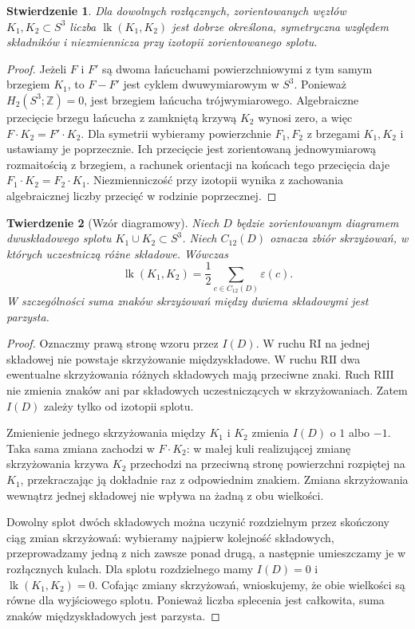 \documentclass[11pt,a4paper]{report}
\numberwithin{equation}{section}
\theoremstyle{plain}
\newtheorem{twierdzenie}{Twierdzenie}[section]
\newtheorem{stwierdzenie}[twierdzenie]{Stwierdzenie}
\theoremstyle{definition}
\theoremstyle{remark}
\begin{document}
\begin{stwierdzenie}
Dla dowolnych rozłącznych, zorientowanych węzłów
$K_1,K_2\subset S^3$ liczba $\operatorname{lk}(K_1,K_2)$ jest
dobrze określona, symetryczna względem składników i niezmiennicza
przy izotopii zorientowanego splotu.
\end{stwierdzenie}

\begin{proof}
Jeżeli $F$ i $F'$ są dwoma łańcuchami powierzchniowymi z tym samym
brzegiem $K_1$, to $F-F'$ jest cyklem dwuwymiarowym w $S^3$.
Ponieważ $H_2(S^3;\mathbb Z)=0$, jest brzegiem łańcucha
trójwymiarowego. Algebraiczne przecięcie brzegu łańcucha z zamkniętą
krzywą $K_2$ wynosi zero, a więc $F\cdot K_2=F'\cdot K_2$.
Dla symetrii wybieramy powierzchnie $F_1,F_2$ z brzegami
$K_1,K_2$ i ustawiamy je poprzecznie. Ich przecięcie jest
zorientowaną jednowymiarową rozmaitością z brzegiem, a rachunek
orientacji na końcach tego przecięcia daje
$F_1\cdot K_2=F_2\cdot K_1$. Niezmienniczość przy izotopii wynika z
zachowania algebraicznej liczby przecięć w rodzinie poprzecznej.
\end{proof}

\begin{twierdzenie}[Wzór diagramowy]
Niech $D$ będzie zorientowanym diagramem dwuskładowego splotu
$K_1\cup K_2\subset S^3$. Niech $C_{12}(D)$ oznacza zbiór
skrzyżowań, w których uczestniczą różne składowe. Wówczas
\[
\operatorname{lk}(K_1,K_2)=\frac12\sum_{c\in C_{12}(D)}\varepsilon(c).
\]
W szczególności suma znaków skrzyżowań między dwiema składowymi
jest parzysta.
\end{twierdzenie}

\begin{proof}
Oznaczmy prawą stronę wzoru przez $I(D)$. W ruchu $\mathrm{R I}$
na jednej składowej nie powstaje skrzyżowanie międzyskładowe.
W ruchu $\mathrm{R II}$ dwa ewentualne skrzyżowania różnych
składowych mają przeciwne znaki. Ruch $\mathrm{R III}$ nie
zmienia znaków ani par składowych uczestniczących w
skrzyżowaniach. Zatem $I(D)$ zależy tylko od izotopii splotu.

Zmienienie jednego skrzyżowania między $K_1$ i $K_2$
zmienia $I(D)$ o $1$ albo $-1$. Taka sama zmiana zachodzi
w $F\cdot K_2$: w małej kuli realizującej zmianę
skrzyżowania krzywa $K_2$ przechodzi na przeciwną stronę
powierzchni rozpiętej na $K_1$, przekraczając ją dokładnie
raz z odpowiednim znakiem. Zmiana skrzyżowania wewnątrz
jednej składowej nie wpływa na żadną z obu wielkości.

Dowolny splot dwóch składowych można uczynić rozdzielnym
przez skończony ciąg zmian skrzyżowań: wybieramy najpierw
kolejność składowych, przeprowadzamy jedną z nich zawsze
ponad drugą, a następnie umieszczamy je w rozłącznych kulach.
Dla splotu rozdzielnego mamy $I(D)=0$ i
$\operatorname{lk}(K_1,K_2)=0$. Cofając zmiany skrzyżowań,
wnioskujemy, że obie wielkości są równe dla wyjściowego
splotu. Ponieważ liczba splecenia jest całkowita, suma znaków
międzyskładowych jest parzysta.
\end{proof}
\end{document}
